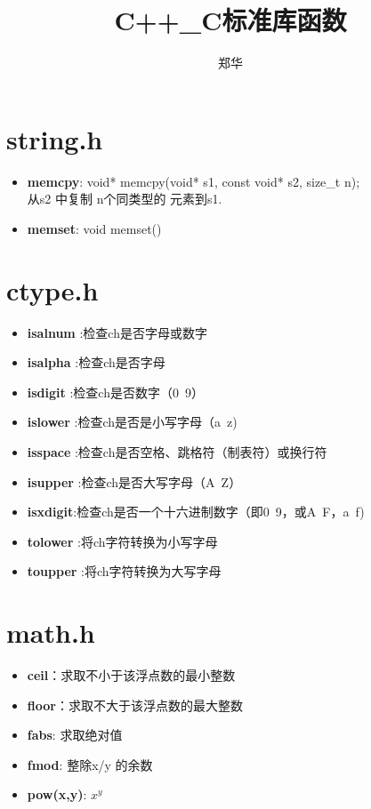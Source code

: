 \documentclass[UTF8,a4paper,12pt]{ctexbook}
\author{\kaishu 郑华}
\title{\heiti C++\_C标准库函数}
\begin{document}
 	\maketitle
 	
\chapter{string.h}
	\begin{itemize}
		\item \textbf{memcpy}: void* memcpy(void* s1, const void* s2, size\_t n); \\
			从s2 中复制 n个同类型的 元素到s1.
		
		\item \textbf{memset}: void memset()
	\end{itemize}
	
\chapter{ctype.h}
	\begin{itemize}
		\item \textbf{isalnum} :检查ch是否字母或数字
		\item \textbf{isalpha} :检查ch是否字母
		\item \textbf{isdigit} :检查ch是否数字（0~9）
		\item \textbf{islower} :检查ch是否是小写字母（a~z)
		\item \textbf{isspace} :检查ch是否空格、跳格符（制表符）或换行符
		\item \textbf{isupper} :检查ch是否大写字母（A~Z）
		\item \textbf{isxdigit}:检查ch是否一个十六进制数字（即0~9，或A~F，a~f)
		\item \textbf{tolower} :将ch字符转换为小写字母
		\item \textbf{toupper} :将ch字符转换为大写字母
	\end{itemize}
\chapter{math.h}
	\begin{itemize}
		\item \textbf{ceil}：求取不小于该浮点数的最小整数
		\item \textbf{floor}：求取不大于该浮点数的最大整数
		\item \textbf{fabs}: 求取绝对值
		\item \textbf{fmod}: 整除x/y 的余数
		\item \textbf{pow(x,y)}: $x^y$
	\end{itemize}
\end{document}
